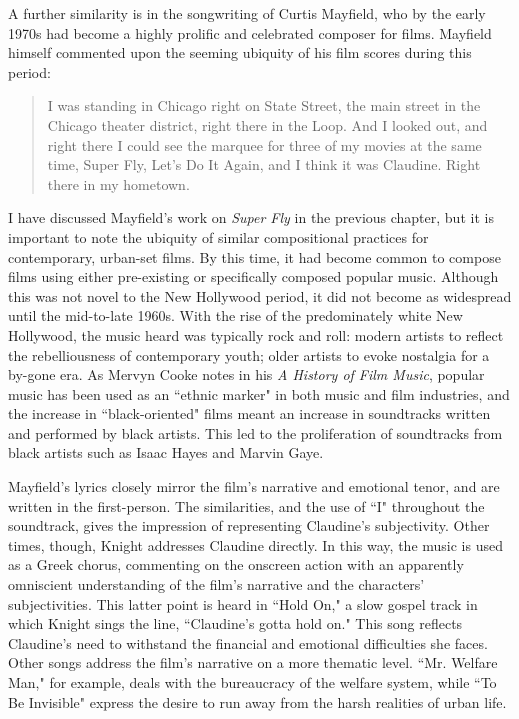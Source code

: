 A further similarity is in the songwriting of Curtis Mayfield, who by the early 1970s had become a highly prolific and celebrated composer for films. 
Mayfield himself commented upon the seeming ubiquity of his film scores during this period:
\begin{quote}
I was standing in Chicago right on State Street, the main street in the Chicago theater district, right there in the Loop. And I looked out, and right there I could see the marquee for three of my movies at the same time, Super Fly, Let’s Do It Again, and I think it was Claudine. Right there in my hometown.\autocite[][216]{werner_higher_2004}
\end{quote}
I have discussed Mayfield's work on \textit{Super Fly} in the previous chapter, but it is important to note the ubiquity of similar compositional practices for contemporary, urban-set films.
By this time, it had become common to compose films using either pre-existing or specifically composed popular music.
Although this was not novel to the New Hollywood period, it did not become as widespread until the mid-to-late 1960s. 
With the rise of the predominately white New Hollywood, the music heard was typically rock and roll: modern artists to reflect the rebelliousness of contemporary youth; older artists to evoke nostalgia for a by-gone era.
As Mervyn Cooke notes in his \textit{A History of Film Music}, popular music has been used as an ``ethnic marker" in both music and film industries, and the increase in ``black-oriented" films meant an increase in soundtracks written and performed by black artists.\autocite[Cooke writes that, following the threat of legal by the National Association for the Advancement of Colored People unless more people of colour were hired in the film industry, by 1972 roughly 25\% of US-produced films were ``black-oriented."][401]{cooke_history_2008}
This led to the proliferation of soundtracks from black artists such as Isaac Hayes and Marvin Gaye.

Mayfield's lyrics closely mirror the film's narrative and emotional tenor, and are written in the first-person.
The similarities, and the use of ``I" throughout the soundtrack, gives the impression of representing Claudine's subjectivity.
Other times, though, Knight addresses Claudine directly.
In this way, the music is used as a Greek chorus, commenting on the onscreen action with an apparently omniscient understanding of the film's narrative and the characters' subjectivities.
This latter point is heard in ``Hold On," a slow gospel track in which Knight sings the line, ``Claudine's gotta hold on."
This song reflects Claudine's need to withstand the financial and emotional difficulties she faces.
Other songs address the film's narrative on a more thematic level.
``Mr. Welfare Man," for example, deals with the bureaucracy of the welfare system, while ``To Be Invisible" express the desire to run away from the harsh realities of urban life.

